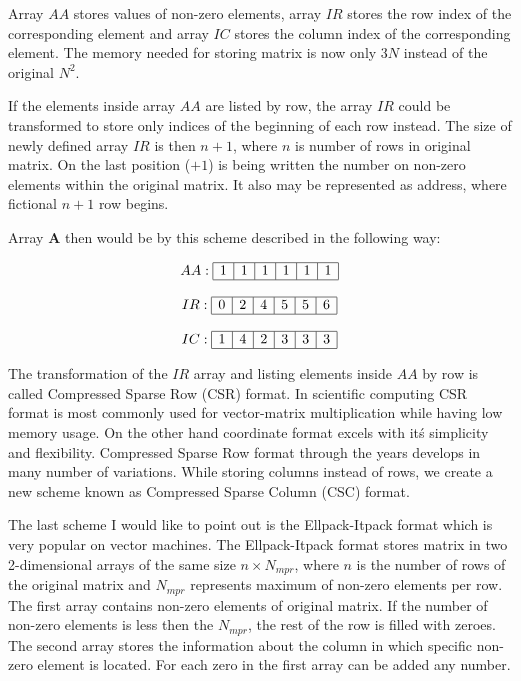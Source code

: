 \documentclass[thesis=M,english]{FITthesis}[2012/10/20]
\begin{document}
Array $AA$ stores values of non-zero elements, array $IR$ stores the row index of the corresponding element and array $IC$ stores the column index of the corresponding element. The memory needed for storing matrix is now only $3N$ instead of the original $N^2$.

If the elements inside array $AA$ are listed by row, the array $IR$ could be transformed to store only indices of the beginning of each row instead. The size of newly defined array $IR$ is then $n+1$, where $n$ is number of rows in original matrix. On the last position ($+1$) is being written the number on non-zero elements within the original matrix. It also may be represented as address, where fictional $n+1$ row begins. 

Array $\textbf{A}$ then would be by this scheme described in the following way:

$$
\begin{array}{c}
AA:
\begin{array}{|c|c|c|c|c|c|}
 \hline
 1 & 1 & 1 & 1 & 1 & 1 \\
 \hline
\end{array}
\\ \\
IR:
\begin{array}{|c|c|c|c|c|c|}
 \hline
 0 & 2 & 4 & 5 & 5 & 6 \\
 \hline
\end{array}
\\ \\
IC:
\begin{array}{|c|c|c|c|c|c|}
 \hline
 1 & 4 & 2 & 3 & 3 & 3 \\
 \hline
\end{array}
\end{array}
$$



The transformation of the $IR$ array and listing elements inside $AA$ by row is called Compressed Sparse Row (CSR) format. In scientific computing CSR format is most commonly used for vector-matrix multiplication while having low memory usage. On the other hand coordinate format excels with it\'s simplicity and flexibility.
Compressed Sparse Row format through the years develops in many number of variations. 
While storing columns instead of rows, we create a new scheme known as Compressed Sparse Column (CSC) format.

The last scheme I would like to point out is the Ellpack-Itpack format which is very popular on vector machines. The Ellpack-Itpack format stores matrix in two 2-dimensional arrays of the same size $n \times N_{mpr}$, where $n$ is the number of rows of the original matrix and $N_{mpr}$ represents maximum of non-zero elements per row. The first array contains non-zero elements of original matrix. If the number of non-zero elements is less then the $N_{mpr}$, the rest of the row is filled with zeroes. The second array stores the information about the column in which specific non-zero element is located. For each zero in the first array can be added any number.
\end{document}
